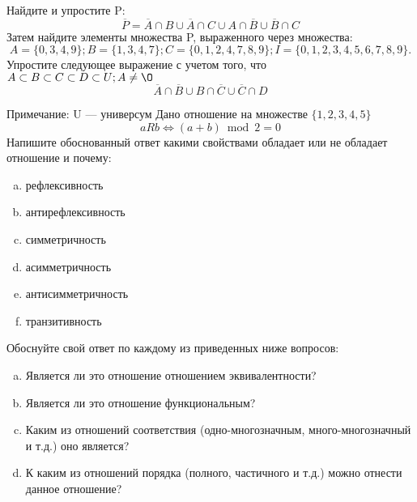 \documentclass[10pt]{exam}
\begin{document}
\begin{questions}
\question
Найдите и упростите P:
\begin{equation*}
\overline{P} = \overline{A} \cap B \cup \overline{A} \cap C \cup A \cap \overline{B} \cup \overline{B} \cap C
\end{equation*}
Затем найдите элементы множества P, выраженного через множества:
\begin{equation*}
A = \{0, 3, 4, 9\}; 
B = \{1, 3, 4, 7\};
C = \{0, 1, 2, 4, 7, 8, 9\};
I = \{0, 1, 2, 3, 4, 5, 6, 7, 8, 9\}.
\end{equation*}\question
Упростите следующее выражение с учетом того, что $A\subset B \subset C \subset D \subset U; A \neq \O$
\begin{equation*}
\overline{A} \cap \overline{B} \cup B \cap \overline{C} \cup \overline{C} \cap D
\end{equation*}

Примечание: U — универсум\question
Дано отношение на множестве $\{1, 2, 3, 4, 5\}$ 
\begin{equation*}
aRb \iff (a+b) \bmod 2 =0
\end{equation*}
Напишите обоснованный ответ какими свойствами обладает или не обладает отношение и почему:   
\begin{enumerate} [a)]\setcounter{enumi}{0}
\item рефлексивность
\item антирефлексивность
\item симметричность
\item асимметричность
\item антисимметричность
\item транзитивность
\end{enumerate}

Обоснуйте свой ответ по каждому из приведенных ниже вопросов:
\begin{enumerate} [a)]\setcounter{enumi}{0}
    \item Является ли это отношение отношением эквивалентности?
    \item Является ли это отношение функциональным?
    \item Каким из отношений соответствия (одно-многозначным, много-многозначный и т.д.) оно является?
    \item К каким из отношений порядка (полного, частичного и т.д.) можно отнести данное отношение?
\end{enumerate}




\end{questions}
\end{document}
